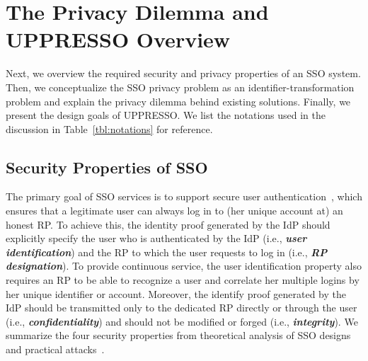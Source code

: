 \section{The Privacy Dilemma and UPPRESSO Overview}
\label{sec:challenge}
Next, we overview the required security and privacy properties of an SSO system. Then, we conceptualize the SSO privacy problem as an identifier-transformation problem and explain the privacy dilemma behind existing solutions. Finally, we present the design goals of UPPRESSO. %
We list the notations used in the discussion in Table~\ref{tbl:notations} for reference.

\subsection{Security Properties of SSO}
\label{subsec:basicrequirements}
The primary goal of SSO services is to support secure user authentication~\cite{SPRESSO}, which ensures that a legitimate user can always log in to (her unique account at) an honest RP. To achieve this, the identity proof generated by the IdP should explicitly specify the user who is authenticated by the IdP (i.e., \textbf{\textit{user identification}}) and the RP to which the user requests to log in (i.e., \textbf{\textit{RP designation}}). To provide continuous service, the user identification property also requires an RP to be able to recognize a user and correlate her multiple logins by her unique identifier or account. Moreover, the identify proof generated by the IdP should be transmitted only to the dedicated RP directly or through the user (i.e., \textbf{\textit{confidentiality}}) and should not be modified or forged (i.e., \textbf{\textit{integrity}}). We summarize the four security properties from theoretical analysis of SSO designs~\cite{ArmandoCCCT08,FettKS16, FettKS17} and practical attacks~\cite{SomorovskyMSKJ12, WangCW12, ArmandoCCCPS13, ZhouE14, WangZLLYLG15, WangZLG16, YangLLZH16, MainkaMS16, MainkaMSW17, YangLCZ18, YangLS17, ShiWL19, ChenPCTKT14, ccsSunB12, DiscoveringJCS, dimvaLiM16, CaoSBKVC14, TowardsShehabM14}.

